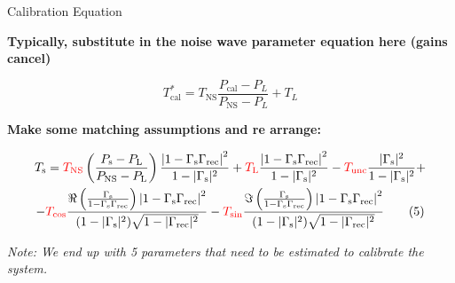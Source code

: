 \documentclass[aspectratio=169]{beamer}
\begin{document}
\begin{frame}{\small{Calibration Equation}}

	\vspace{0.2cm} %

	\textbf{Typically, substitute in the noise wave parameter equation here (gains cancel)}

	\vspace{0.2cm} %

	{\tiny
		\begin{equation}
			T_{\text{cal}}^* = T_{\text{NS}} \frac{P_{\text{cal}} - P_L}{P_{\text{NS}} - P_L} + T_L \tag{4}
		\end{equation}
	}

	\vspace{0.3cm} %

	\textbf{Make some matching assumptions and re arrange:}

	\vspace{0.2cm} %

	{\tiny
		\begin{multline}
			T_\mathrm{s} = \textcolor{red}{T_\mathrm{NS}}\left(\frac{P_\mathrm{s} - P_\mathrm{L}}{P_\mathrm{NS} - P_\mathrm{L}}\right)\frac{\left|1 - \Gamma_\mathrm{s}\Gamma_\mathrm{rec}\right|^2}{1 - |\Gamma_\mathrm{s}|^2} + \textcolor{red}{T_\mathrm{L}}\frac{\left|1 - \Gamma_\mathrm{s}\Gamma_\mathrm{rec}\right|^2}{1 - |\Gamma_\mathrm{s}|^2} - \textcolor{red}{T_\mathrm{unc}} \frac{|\Gamma_\mathrm{s}|^2}{1 - |\Gamma_\mathrm{s}|^2} +  \\
			-\textcolor{red}{T_\mathrm{cos}} \frac{\Re \left( \frac{\Gamma_\mathrm{s}}{1 - \Gamma_\mathrm{s}\Gamma_\mathrm{rec}} \right)\left|1 - \Gamma_\mathrm{s}\Gamma_\mathrm{rec}\right|^2}{(1 - |\Gamma_\mathrm{s}|^2) \sqrt{1 - |\Gamma_\mathrm{rec}|^2}}  -\textcolor{red}{T_\mathrm{sin}} \frac{\Im \left( \frac{\Gamma_\mathrm{s}}{1 - \Gamma_\mathrm{s}\Gamma_\mathrm{rec}} \right)\left|1 - \Gamma_\mathrm{s}\Gamma_\mathrm{rec}\right|^2}{(1 - |\Gamma_\mathrm{s}|^2) \sqrt{1 - |\Gamma_\mathrm{rec}|^2}} \tag{5}
		\end{multline}
	}

	\textit{Note: We end up with 5 parameters that need to be estimated to calibrate the system.}

	\vfill %
\end{frame}
\end{document}

